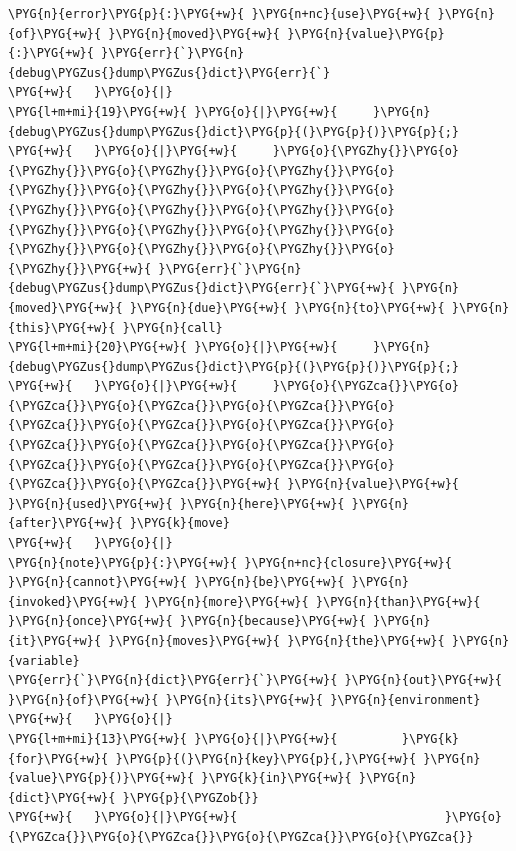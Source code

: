 \begin{Verbatim}[commandchars=\\\{\},breaklines=true,breakanywhere=true,fontsize=\codefont,xleftmargin=17bp]
\PYG{n}{error}\PYG{p}{:}\PYG{+w}{ }\PYG{n+nc}{use}\PYG{+w}{ }\PYG{n}{of}\PYG{+w}{ }\PYG{n}{moved}\PYG{+w}{ }\PYG{n}{value}\PYG{p}{:}\PYG{+w}{ }\PYG{err}{`}\PYG{n}{debug\PYGZus{}dump\PYGZus{}dict}\PYG{err}{`}
\PYG{+w}{   }\PYG{o}{|}
\PYG{l+m+mi}{19}\PYG{+w}{ }\PYG{o}{|}\PYG{+w}{     }\PYG{n}{debug\PYGZus{}dump\PYGZus{}dict}\PYG{p}{(}\PYG{p}{)}\PYG{p}{;}
\PYG{+w}{   }\PYG{o}{|}\PYG{+w}{     }\PYG{o}{\PYGZhy{}}\PYG{o}{\PYGZhy{}}\PYG{o}{\PYGZhy{}}\PYG{o}{\PYGZhy{}}\PYG{o}{\PYGZhy{}}\PYG{o}{\PYGZhy{}}\PYG{o}{\PYGZhy{}}\PYG{o}{\PYGZhy{}}\PYG{o}{\PYGZhy{}}\PYG{o}{\PYGZhy{}}\PYG{o}{\PYGZhy{}}\PYG{o}{\PYGZhy{}}\PYG{o}{\PYGZhy{}}\PYG{o}{\PYGZhy{}}\PYG{o}{\PYGZhy{}}\PYG{o}{\PYGZhy{}}\PYG{o}{\PYGZhy{}}\PYG{+w}{ }\PYG{err}{`}\PYG{n}{debug\PYGZus{}dump\PYGZus{}dict}\PYG{err}{`}\PYG{+w}{ }\PYG{n}{moved}\PYG{+w}{ }\PYG{n}{due}\PYG{+w}{ }\PYG{n}{to}\PYG{+w}{ }\PYG{n}{this}\PYG{+w}{ }\PYG{n}{call}
\PYG{l+m+mi}{20}\PYG{+w}{ }\PYG{o}{|}\PYG{+w}{     }\PYG{n}{debug\PYGZus{}dump\PYGZus{}dict}\PYG{p}{(}\PYG{p}{)}\PYG{p}{;}
\PYG{+w}{   }\PYG{o}{|}\PYG{+w}{     }\PYG{o}{\PYGZca{}}\PYG{o}{\PYGZca{}}\PYG{o}{\PYGZca{}}\PYG{o}{\PYGZca{}}\PYG{o}{\PYGZca{}}\PYG{o}{\PYGZca{}}\PYG{o}{\PYGZca{}}\PYG{o}{\PYGZca{}}\PYG{o}{\PYGZca{}}\PYG{o}{\PYGZca{}}\PYG{o}{\PYGZca{}}\PYG{o}{\PYGZca{}}\PYG{o}{\PYGZca{}}\PYG{o}{\PYGZca{}}\PYG{o}{\PYGZca{}}\PYG{+w}{ }\PYG{n}{value}\PYG{+w}{ }\PYG{n}{used}\PYG{+w}{ }\PYG{n}{here}\PYG{+w}{ }\PYG{n}{after}\PYG{+w}{ }\PYG{k}{move}
\PYG{+w}{   }\PYG{o}{|}
\PYG{n}{note}\PYG{p}{:}\PYG{+w}{ }\PYG{n+nc}{closure}\PYG{+w}{ }\PYG{n}{cannot}\PYG{+w}{ }\PYG{n}{be}\PYG{+w}{ }\PYG{n}{invoked}\PYG{+w}{ }\PYG{n}{more}\PYG{+w}{ }\PYG{n}{than}\PYG{+w}{ }\PYG{n}{once}\PYG{+w}{ }\PYG{n}{because}\PYG{+w}{ }\PYG{n}{it}\PYG{+w}{ }\PYG{n}{moves}\PYG{+w}{ }\PYG{n}{the}\PYG{+w}{ }\PYG{n}{variable}
\PYG{err}{`}\PYG{n}{dict}\PYG{err}{`}\PYG{+w}{ }\PYG{n}{out}\PYG{+w}{ }\PYG{n}{of}\PYG{+w}{ }\PYG{n}{its}\PYG{+w}{ }\PYG{n}{environment}
\PYG{+w}{   }\PYG{o}{|}
\PYG{l+m+mi}{13}\PYG{+w}{ }\PYG{o}{|}\PYG{+w}{         }\PYG{k}{for}\PYG{+w}{ }\PYG{p}{(}\PYG{n}{key}\PYG{p}{,}\PYG{+w}{ }\PYG{n}{value}\PYG{p}{)}\PYG{+w}{ }\PYG{k}{in}\PYG{+w}{ }\PYG{n}{dict}\PYG{+w}{ }\PYG{p}{\PYGZob{}}
\PYG{+w}{   }\PYG{o}{|}\PYG{+w}{                             }\PYG{o}{\PYGZca{}}\PYG{o}{\PYGZca{}}\PYG{o}{\PYGZca{}}\PYG{o}{\PYGZca{}}
\end{Verbatim}

